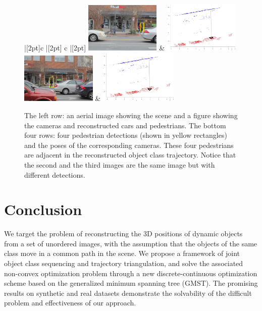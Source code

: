 \begin{figure}
\begin{tabu}{ |[2pt]c |[2pt] c |[2pt]}
\tabucline[2pt]{-}
\includegraphics[width=0.32\textwidth]{chapter4/resource/cleanFrame085.jpg} & 
\includegraphics[width=0.32\textwidth]{chapter4/resource/Frame_085_crop.jpg} \\
\tabucline[2pt]{-}
\includegraphics[width=0.32\textwidth]{chapter4/resource/cleanFrame086.jpg} &
\includegraphics[width=0.33\textwidth]{chapter4/resource/Frame_086_crop.jpg}\\
\tabucline[2pt]{-}
\end{tabu}
\caption[Illustration of pedestrian reconstruction results.]{The left row: an aerial image showing the scene and a figure showing the cameras and reconstructed cars and pedestrians. The bottom four rows: four pedestrian detections (shown in yellow rectangles) and the poses of the corresponding cameras. These four pedestrians are adjacent in the reconstructed object class trajectory. Notice that the second and the third images are the same image but with different detections.}
\label{fig:franklin_Recon}
\end{figure}

\section{Conclusion}
We target the problem of reconstructing the 3D positions of dynamic objects from a set of unordered images, with the assumption that the objects of the same class move in a common path in the scene. 
We propose a framework of joint object class sequencing and trajectory triangulation, and solve the associated non-convex optimization problem through a new discrete-continuous optimization scheme based on the generalized minimum spanning tree (GMST).
The promising results on synthetic and real datasets demonstrate the solvability of the difficult problem and effectiveness of our approach.

